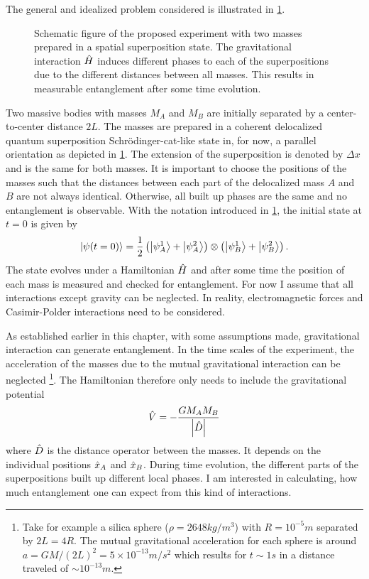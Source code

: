 The general and idealized problem considered is illustrated in \cref{fig:2:simple-problem}.
\begin{figure}[!htbp]
  \centering
  \def\svgwidth{\textwidth}
  
  \caption{Schematic figure of the proposed experiment with two masses prepared in a spatial superposition state. The gravitational interaction $\hat{H}$ induces different phases to each of the superpositions due to the different distances between all masses. This results in measurable entanglement after some time evolution.}
  \label{fig:2:simple-problem}
\end{figure}
Two massive bodies with masses $M_A$ and $M_B$ are initially separated by a center-to-center distance $2L$. The masses are prepared in a coherent delocalized quantum superposition Schrödinger-cat-like state in, for now, a parallel orientation as depicted in \cref{fig:2:simple-problem}.
The extension of the superposition is denoted by $\Delta x$ and is the same for both masses.
It is important to choose the positions of the masses such that the distances between each part of the delocalized mass $A$ and $B$ are not always identical. 
Otherwise, all built up phases are the same and no entanglement is observable.
With the notation introduced in \cref{fig:2:simple-problem}, the initial state at $t=0$ is given by
\begin{equation}\label{eq:2:initial-state}
  \ket{\psi(t=0)} = \frac{1}{2}\left( \ket{\psi_A^1} + \ket{\psi_A^2} \right) \otimes \left( \ket{\psi_B^1} + \ket{\psi_B^2} \right) .
\end{equation}
The state evolves under a Hamiltonian $\hat{H}$ and after some time the position of each mass is measured and checked for entanglement.
For now I assume that all interactions except gravity can be neglected. In reality, electromagnetic forces and Casimir-Polder interactions \cite{Casimir_1948, Casimir_1948a} need to be considered.

As established earlier in this chapter, with some assumptions made, gravitational interaction can generate entanglement. In the time scales of the experiment, the acceleration of the masses due to the mutual gravitational interaction can be neglected \footnote{Take for example a silica sphere ($\rho = 2648 \si{kg/m^3}$) with $R=10^{-5}\si{m}$ separated by $2L=4R$. The mutual gravitational acceleration for each sphere is around $a=GM/(2L)^2 = 5 \times 10^{-13}\si{m/s^2}$ which results for $t\sim 1 \si{s}$ in a distance traveled of $\sim 10^{-13}\si{m}$.}. The Hamiltonian therefore only needs to include the gravitational potential 
\begin{equation} \label{eq:2:potential}
  \hat{V} = -\frac{GM_AM_B}{\left\lvert\hat{D}\right\rvert}
\end{equation}
where $\hat{D}$ is the distance operator between the masses. It depends on the individual positions $\hat{x}_A$ and $\hat{x}_B$.
During time evolution, the different parts of the superpositions built up different local phases. I am interested in calculating, how much entanglement one can expect from this kind of interactions.






